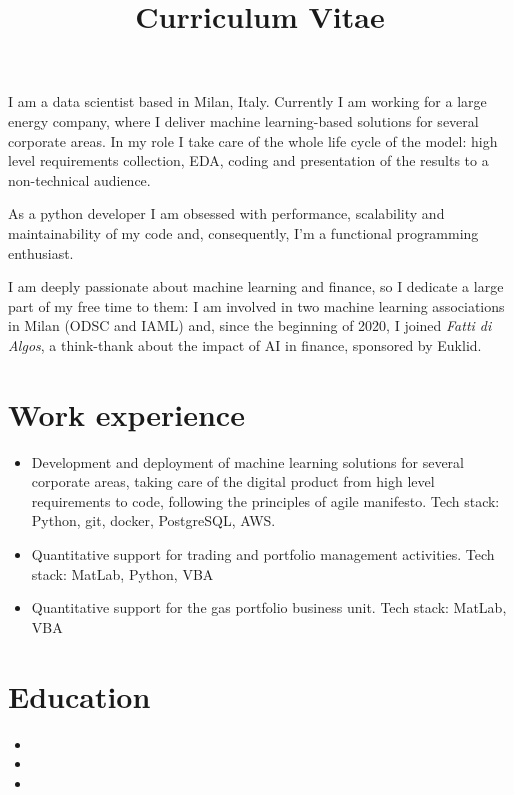 \documentclass[11pt,a4paper,sans]{moderncv}        %
\title{Curriculum Vitae}                               %
\begin{document}
\makecvtitle
\small{I am a data scientist based in Milan, Italy. Currently I am working for a large energy company, where I deliver machine learning-based solutions for several corporate areas.
In my role I take care of the whole life cycle of the model: high level requirements collection, EDA, coding and presentation of the results to a non-technical audience. 

As a python developer I am obsessed with performance, scalability and maintainability of my code and, consequently, I'm a functional programming enthusiast. 

I am deeply passionate about machine learning and finance, so I dedicate a large part of my free time to them: I am involved in two machine learning associations in Milan (ODSC and IAML) and, since the beginning of 2020, I joined \emph{Fatti di Algos}, a think-thank about the impact of AI in finance, sponsored by Euklid.}

\section{Work experience}

\begin{itemize}
\item{
Development and deployment of machine learning solutions for several corporate areas, taking care of the digital product from high level requirements to code, following the principles of agile manifesto. Tech stack: Python, git, docker, PostgreSQL, AWS.
}
\item{
Quantitative support for trading and portfolio management activities. Tech stack: MatLab, Python, VBA
}
\item{
Quantitative support for the gas portfolio business unit. Tech stack: MatLab, VBA}
\end{itemize}

\section{Education}
\begin{itemize}
\item{}
\item{}
\item{}
\end{itemize}
\end{document}
